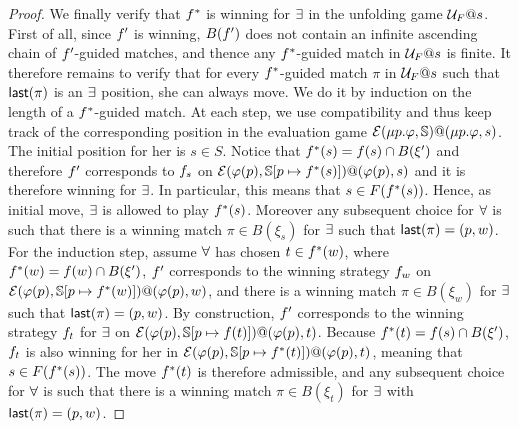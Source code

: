 \begin{proof}
We finally verify that $f^*$ is winning for $\exists$ in the unfolding
game $\mathcal{U}_F@s$. 
First of all, since $f'$ is winning, $B(f')$ does not contain an
infinite ascending chain of $f'$-guided matches, and thence any
$f^*$-guided match in $\mathcal{U}_{F}@s$ is finite. 
It therefore remains to verify that for every $f^*$-guided match $\pi$ 
in $\mathcal{U}_{F}@s$ such that $\textsf{last}(\pi)$ is an $\exists$ position, she can always
move.
We do it by induction on the length of a $f^*$-guided match. 
At each step, we use compatibility and thus keep track of the corresponding 
position in the evaluation game $\mathcal{E}(\mu p.\varphi,\mathbb{S})@(\mu p.\varphi,s)$. 
The initial position for her is $s \in S$. Notice that $f^*(s) = 
f(s) \cap B(\xi')$ and therefore $f'$ corresponds to $f_s$
on $\mathcal{E}(\varphi(p),\mathbb{S}[p \mapsto f^*(s)])@(\varphi(p),s)$ and it is 
therefore winning for $\exists$.
In particular, this means  that $s \in F(f^*(s))$.
Hence, as initial move, $\exists$ is allowed to play $f^*(s)$. 
Moreover any subsequent choice for $\forall$ is such that there is a winning
match $\pi \in B(\xi_s)$ for $\exists$ such that $\textsf{last}(\pi)=(p,w)$. 
For the induction step, assume $\forall$ has chosen $ t \in f^*(w)$, 
where $f^*(w) = f(w) \cap B(\xi')$, $f'$ corresponds to the
winning strategy $f_w$ on $\mathcal{E}(\varphi(p),\mathbb{S}[p \mapsto 
f^*(w)])@(\varphi(p),w)$, and there is a winning match $\pi \in B(\xi_w)$ 
for $\exists$ such that $\textsf{last}(\pi)=(p,w)$. 
By construction, $f'$ corresponds to the winning strategy $f_t$ 
for $\exists$ on $\mathcal{E}(\varphi(p),\mathbb{S}[p \mapsto f(t)])@(\varphi(p),t)$. 
Because $f^*(t)= f(s) \cap B(\xi')$, $f_t$ is also winning
for her in $\mathcal{E}(\varphi(p),\mathbb{S}[p \mapsto f^*(t)])@(\varphi(p),t)$, meaning
that $s \in F(f^*(s))$. 
The move $f^*(t)$ is therefore admissible, and any subsequent choice for
$\forall$ is such that there is a winning match $\pi \in B(\xi_t)$ for 
$\exists$ with $\textsf{last}(\pi)=(p,w)$.
\end{proof}

